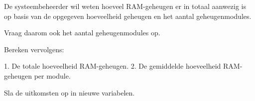 
De systeembeheerder wil weten hoeveel RAM-geheugen er in totaal aanwezig is op basis van de opgegeven hoeveelheid geheugen en het aantal geheugenmodules.

Vraag daarom ook het aantal geheugenmodules op.

Bereken vervolgens:

1. De totale hoeveelheid RAM-geheugen.
2. De gemiddelde hoeveelheid RAM-geheugen per module.

Sla de uitkomsten op in nieuwe variabelen.

